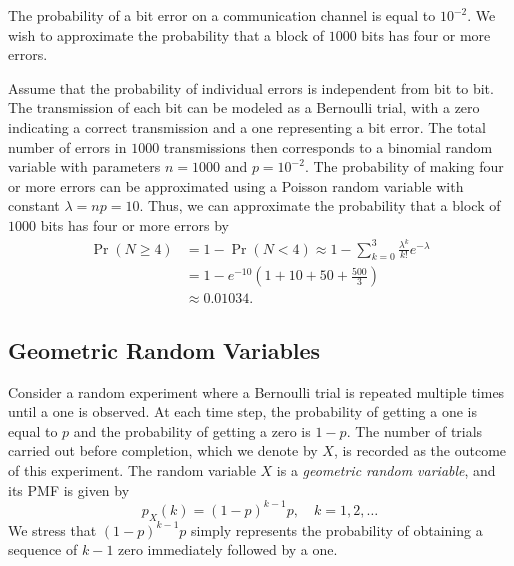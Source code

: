 \begin{example}
The probability of a bit error on a communication channel is equal to $10^{-2}$.
We wish to approximate the probability that a block of $1000$ bits has four or more errors.

Assume that the probability of individual errors is independent from bit to bit.
The transmission of each bit can be modeled as a Bernoulli trial, with a zero indicating a correct transmission and a one representing a bit error.
The total number of errors in $1000$ transmissions then corresponds to a binomial random variable with parameters $n = 1000$ and $p = 10^{-2}$.
The probability of making four or more errors can be approximated using a Poisson random variable with constant $\lambda = np = 10$.
Thus, we can approximate the probability that a block of $1000$ bits has four or more errors by
\begin{equation*}
\begin{split}
\Pr ( N \geq 4 ) &= 1 - \Pr ( N < 4 )
\approx 1 - \sum_{k=0}^3 \frac{\lambda^k}{k!} e^{-\lambda} \\
&= 1 - e^{-10} \left( 1 + 10 + 50 + \frac{500}{3} \right) \\
&\approx 0.01034 .
\end{split}
\end{equation*}
\end{example}


\subsection{Geometric Random Variables}

Consider a random experiment where a Bernoulli trial is repeated multiple times until a one is observed.
At each time step, the probability of getting a one is equal to $p$ and the probability of getting a zero is $1-p$.
The number of trials carried out before completion, which we denote by $X$, is recorded as the outcome of this experiment.
The random variable $X$ is a \emph{geometric random variable}, and its PMF is given by 
\begin{equation*}
p_X (k) = (1-p)^{k-1} p, \quad k = 1, 2, \ldots
\end{equation*}
We stress that $(1-p)^{k-1} p$ simply represents the probability of obtaining a sequence of $k-1$ zero immediately followed by a one.

